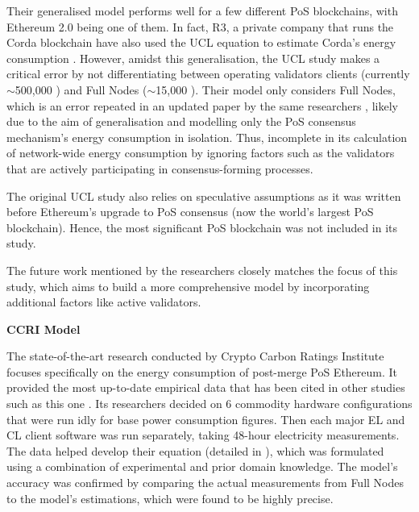 Their generalised model performs well for a few different PoS blockchains, with Ethereum 2.0 being one of them. In fact, R3, a private company that runs the Corda blockchain have also used the UCL  equation to estimate Corda's energy consumption \cite{JustBlog}. However, amidst this generalisation, the UCL study makes a critical error by not differentiating between operating validators clients (currently $\sim$500,000 \cite{EthereumEthereum.orgc}) and Full Nodes ($\sim$15,000 \cite{NodewatchAnalytics}). Their model only considers Full Nodes, which is an error repeated in an updated paper by the same researchers \cite{IbanezTheExpansion}, likely due to the aim of generalisation and modelling only the PoS consensus mechanism's energy consumption in isolation. Thus, incomplete in its calculation of network-wide energy consumption by ignoring factors such as the validators that are actively participating in consensus-forming processes. 

The original UCL study also relies on speculative assumptions as it was written before Ethereum’s upgrade to PoS consensus (now the world’s largest PoS blockchain). Hence, the most significant PoS blockchain was not included in its study.

The future work mentioned by the researchers closely matches the focus of this study, which aims to build a more comprehensive model by incorporating additional factors like active validators.


\textbf{CCRI Model } 
\label{CCRIModelLitRev}

The state-of-the-art research conducted by Crypto Carbon Ratings Institute focuses specifically on the energy consumption of post-merge PoS Ethereum. It provided the most up-to-date empirical data that has been cited in other studies such as this one \cite{CryptoCarbonRatingsInstitute2022TheNetwork}. Its researchers decided on 6 commodity hardware configurations that were run idly for base power consumption figures. Then each major EL and CL client software was run separately, taking 48-hour electricity measurements. The data helped develop their equation (detailed in ), which was formulated using a combination of experimental and prior domain knowledge. The model's accuracy was confirmed by comparing the actual measurements from Full Nodes to the model's estimations, which were found to be highly precise.

